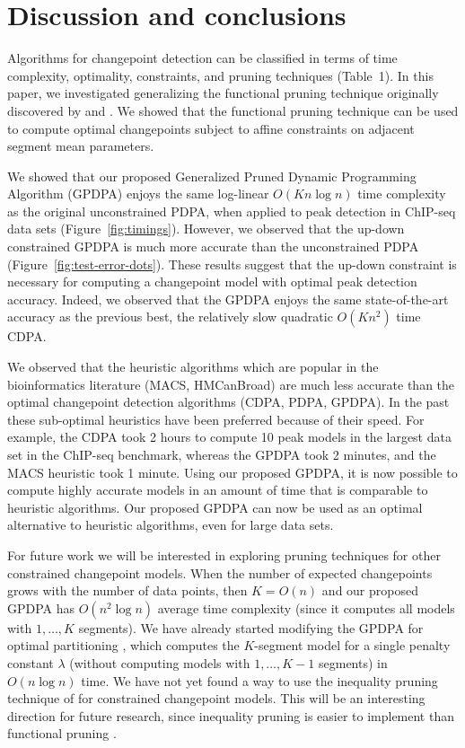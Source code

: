 \documentclass{article}
\begin{document}
\section{Discussion and conclusions}
\label{sec:discussion}

Algorithms for changepoint detection can be classified in terms of
time complexity, optimality, constraints, and pruning techniques
(Table~1). In this paper, we investigated generalizing the functional
pruning technique originally discovered by \citet{pruned-dp} and
\citet{johnson}. We showed that the functional pruning technique can
be used to compute optimal changepoints subject to affine constraints
on adjacent segment mean parameters.

We showed that our proposed Generalized Pruned Dynamic Programming
Algorithm (GPDPA) enjoys the same log-linear $O(Kn\log n)$ time
complexity as the original unconstrained PDPA, when applied to peak
detection in ChIP-seq data sets (Figure~\ref{fig:timings}). However,
we observed that the up-down constrained GPDPA is much more accurate
than the unconstrained PDPA (Figure~\ref{fig:test-error-dots}). These
results suggest that the up-down constraint is necessary for computing
a changepoint model with optimal peak detection accuracy. Indeed, we
observed that the GPDPA enjoys the same state-of-the-art accuracy as
the previous best, the relatively slow quadratic $O(Kn^2)$ time
CDPA.


We observed that the heuristic algorithms which are popular in the
bioinformatics literature (MACS, HMCanBroad) are much less accurate
than the optimal changepoint detection algorithms (CDPA, PDPA,
GPDPA). In the past these sub-optimal heuristics have been preferred
because of their speed. For example, the CDPA took 2 hours to compute
10 peak models in the largest data set in the ChIP-seq benchmark,
whereas the GPDPA took 2 minutes, and the MACS heuristic took 1
minute. Using our proposed GPDPA, it is now possible to compute highly
accurate models in an amount of time that is comparable to heuristic
algorithms. Our proposed GPDPA can now be used as an optimal
alternative to heuristic algorithms, even for large data sets.

For future work we will be interested in exploring pruning techniques
for other constrained changepoint models. When the number of expected
changepoints grows with the number of data points, then $K=O(n)$ and
our proposed GPDPA has $O(n^2 \log n)$ average time complexity (since
it computes all models with $1,\dots,K$ segments). We have already
started modifying the GPDPA for optimal partitioning
\citep{optimal-partitioning}, which computes the $K$-segment model for
a single penalty constant $\lambda$ (without computing models with
$1,\dots,K-1$ segments) in $O(n\log n)$ time. We have not yet found a
way to use the inequality pruning technique of \citet{pelt} for
constrained changepoint models. This will be an interesting direction
for future research, since inequality pruning is easier to implement
than functional pruning \citep{fpop}.



\newpage

\end{document}
